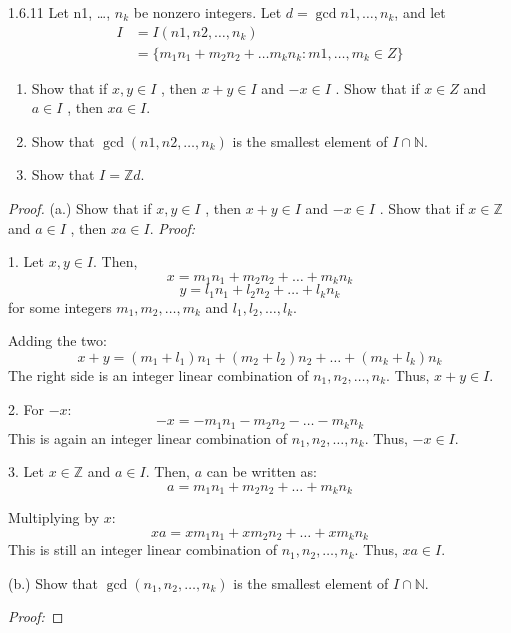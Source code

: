 \documentclass[12pt]{amsart}
\theoremstyle{definition}
\numberwithin{equation}{section}
\theoremstyle{plain}
\newcommand{\Z}{\mathbb{Z}}
\newcommand{\N}{\mathbb{N}}
\begin{document}
\begin{exercise}{1.6.11}
    Let n1, \dots, $n_k$ be nonzero integers. Let $d =\gcd n1, \dots, n_k$,
and let
\begin{align*}
    I &=I(n1, n2, \dots, n_k)\\
      &=\{m_1n_1 + m_2n_2 + \dots m_kn_k : m1, \dots,m_k \in Z\}
\end{align*}

\begin{enumerate}[label=(\alph*.)]
    \item Show that if $x, y\in I$ , then $x + y\in I$ and $-x\in I$ . Show that if
$x\in Z$ and $a\in I$ , then $xa\in I$.
    \item Show that $\gcd(n1, n2, \dots, n_k)$ is the smallest element of $I \cap \N$.
    \item Show that $I=\Z d$.
\end{enumerate}
    \begin{proof}
        (a.) Show that if \( x, y \in I \) , then \( x + y \in I \) and \( -x \in I \) . Show that if \( x \in \Z \) and \( a \in I \) , then \( xa \in I \).
        \textit{Proof:}
        
        1. Let \( x, y \in I \). Then,
        \[ x = m_1n_1 + m_2n_2 + \dots + m_kn_k \]
        \[ y = l_1n_1 + l_2n_2 + \dots + l_kn_k \]
        for some integers \( m_1, m_2, \dots, m_k \) and \( l_1, l_2, \dots, l_k \).
        
        Adding the two:
        \[ x + y = (m_1 + l_1)n_1 + (m_2 + l_2)n_2 + \dots + (m_k + l_k)n_k \]
        The right side is an integer linear combination of \( n_1, n_2, \dots, n_k \). Thus, \( x + y \in I \).
        
        2. For \( -x \):
        \[ -x = -m_1n_1 - m_2n_2 - \dots - m_kn_k \]
        This is again an integer linear combination of \( n_1, n_2, \dots, n_k \). Thus, \( -x \in I \).
        
        3. Let \( x \in \Z \) and \( a \in I \). Then, \( a \) can be written as:
        \[ a = m_1n_1 + m_2n_2 + \dots + m_kn_k \]
        
        Multiplying by \( x \):
        \[ xa = xm_1n_1 + xm_2n_2 + \dots + xm_kn_k \]
        This is still an integer linear combination of \( n_1, n_2, \dots, n_k \). Thus, \( xa \in I \).
        
        (b.) Show that \( \gcd(n_1, n_2, \dots, n_k) \) is the smallest element of \( I \cap \N \).
        
        \textit{Proof:}
        

\end{proof}
\end{exercise}
\end{document}
